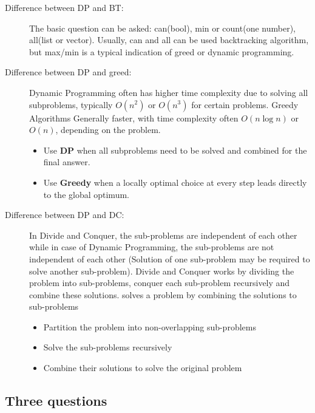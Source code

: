 \documentclass[a4paper,11pt,twoside]{book}
\begin{document}
\begin{description}
	\item[Difference between DP and BT:] The basic question can be asked: can(bool), min or count(one number), all(list or vector). Usually, can and all can be used backtracking algorithm, but max/min is a typical indication of greed or dynamic programming.
	
	
	\item[Difference between DP and greed:] Dynamic Programming often has higher time complexity due to solving all subproblems, typically $O(n^2)$ or $O(n^3)$ for certain problems. Greedy Algorithms Generally faster, with time complexity often $O(n \log n)$ or $O(n)$, depending on the problem.

\begin{itemize}
	\item Use \textbf{DP} when all subproblems need to be solved and combined for the final answer.
	
	\item Use \textbf{Greedy} when a locally optimal choice at every step leads directly to the global optimum.
\end{itemize}
	
	
	\item[Difference between DP and DC:] In Divide and Conquer, the sub-problems are independent of each other while in case of Dynamic Programming, the sub-problems are not independent of each other (Solution of one sub-problem may be required to solve another sub-problem). Divide and Conquer works by dividing the problem into sub-problems, conquer each sub-problem recursively and combine these solutions. solves a problem by combining the solutions to sub-problems
	
	\begin{itemize}
		\item Partition the problem into non-overlapping sub-problems
		
		\item Solve the sub-problems recursively
		
		\item Combine their solutions to solve the original problem
	\end{itemize}
	
\end{description}
	

\subsection{Three questions}
\end{document}

